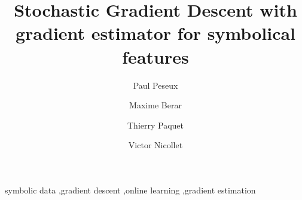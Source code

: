 \documentclass[preprint,12pt,authoryear]{elsarticle}
\newcommand{\tecname}{\textbf{gradient  estimator for symbolical features }}
\begin{document}
\begin{frontmatter}

\title{Stochastic Gradient Descent with \tecname}
\maketitle


\author[Lokad,Litis]{Paul Peseux}
\author[Litis]{Maxime Berar}
\author[Litis]{Thierry Paquet}
\author[Lokad]{Victor Nicollet}


\author{}




\begin{keyword}
symbolic data \sep gradient descent \sep online learning \sep gradient estimation
\end{keyword}
\end{frontmatter}

%











 




\end{document}
